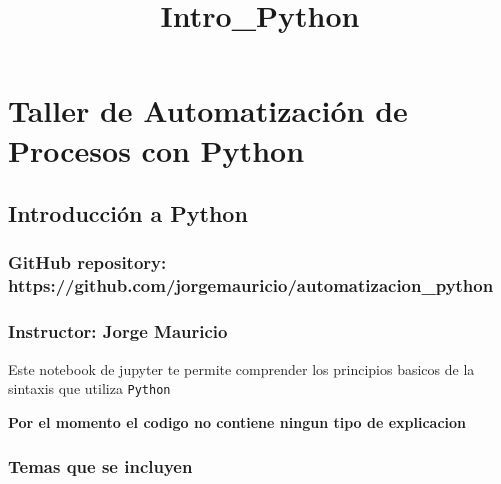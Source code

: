 \documentclass[11pt]{article}
\title{Intro\_Python}
\begin{document}
    
    
    \maketitle
    
    

    
    \section{Taller de Automatización de Procesos con
Python}\label{taller-de-automatizaciuxf3n-de-procesos-con-python}

    \subsection{Introducción a Python}\label{introducciuxf3n-a-python}

\subsubsection{GitHub repository:
https://github.com/jorgemauricio/automatizacion\_python}\label{github-repository-httpsgithub.comjorgemauricioautomatizacion_python}

\subsubsection{Instructor: Jorge
Mauricio}\label{instructor-jorge-mauricio}

    Este notebook de jupyter te permite comprender los principios basicos de
la sintaxis que utiliza \texttt{Python}

\textbf{Por el momento el codigo no contiene ningun tipo de explicacion}

\subsubsection{Temas que se incluyen}\label{temas-que-se-incluyen}
\end{document}
